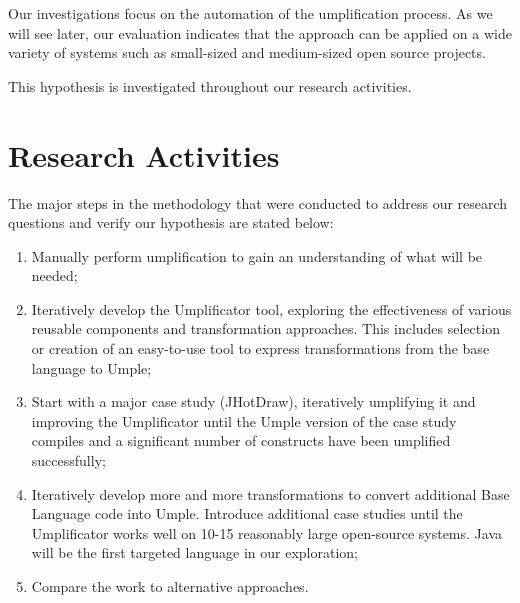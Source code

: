 Our investigations focus on the automation of the umplification process. As we will see later, our evaluation indicates that the approach can be applied on a wide variety of systems such as small-sized  and medium-sized open source projects. 


This hypothesis is investigated throughout our research activities.

\section{Research Activities}

The major steps in the methodology that were conducted to address our research questions and verify our hypothesis are stated below:

\begin{enumerate}
\item 	Manually perform umplification to gain an understanding of what will be needed;

\item 	Iteratively develop the Umplificator tool, exploring the effectiveness of various reusable components and transformation approaches. This includes selection or creation of an easy-to-use tool to express transformations from the base language to Umple;

\item 	Start with a major case study (JHotDraw), iteratively umplifying it and improving the Umplificator until the Umple version of the case study compiles and a significant number of constructs have been umplified successfully;

\item 	Iteratively develop more and more transformations to convert additional Base Language code into Umple. Introduce additional case studies until the Umplificator works well on 10-15 reasonably large open-source systems. Java will be the first targeted language in our exploration; 

\item 	Compare the work to alternative approaches.
\end{enumerate}

